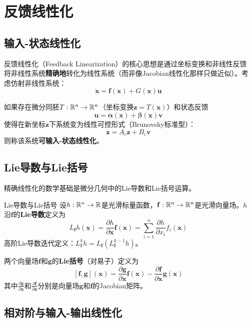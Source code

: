 \section{反馈线性化}

\subsection{输入-状态线性化}

反馈线性化（Feedback Linearization）的核心思想是通过坐标变换和非线性反馈将非线性系统\textbf{精确地}转化为线性系统（而非像Jacobian线性化那样只做近似）。考虑仿射非线性系统：
\[
\dot{\mathbf{x}} = \mathbf{f}(\mathbf{x}) + G(\mathbf{x})\mathbf{u}
\]

如果存在微分同胚$T: \mathbb{R}^n \to \mathbb{R}^n$（坐标变换$\mathbf{z} = T(\mathbf{x})$）和状态反馈
\[
\mathbf{u} = \boldsymbol{\alpha}(\mathbf{x}) + \boldsymbol{\beta}(\mathbf{x})\mathbf{v}
\]
使得在新坐标$\mathbf{z}$下系统变为线性可控形式（Brunovsky标准型）：
\[
\dot{\mathbf{z}} = A_c\mathbf{z} + B_c\mathbf{v}
\]
则称该系统\textbf{可输入-状态线性化}。

\subsection{Lie导数与Lie括号}

精确线性化的数学基础是微分几何中的Lie导数和Lie括号运算。

\begin{mydefinition}{Lie导数与Lie括号}
设$h: \mathbb{R}^n \to \mathbb{R}$是光滑标量函数，$\mathbf{f}: \mathbb{R}^n \to \mathbb{R}^n$是光滑向量场。$h$沿$\mathbf{f}$的\textbf{Lie导数}定义为
\[
L_{\mathbf{f}}h(\mathbf{x}) = \frac{\partial h}{\partial \mathbf{x}}\mathbf{f}(\mathbf{x}) = \sum_{i=1}^{n}\frac{\partial h}{\partial x_i}f_i(\mathbf{x})
\]
高阶Lie导数迭代定义：$L_{\mathbf{f}}^k h = L_{\mathbf{f}}(L_{\mathbf{f}}^{k-1}h)$。

两个向量场$\mathbf{f}$和$\mathbf{g}$的\textbf{Lie括号}（对易子）定义为
\[
[\mathbf{f}, \mathbf{g}](\mathbf{x}) = \frac{\partial \mathbf{g}}{\partial \mathbf{x}}\mathbf{f}(\mathbf{x}) - \frac{\partial \mathbf{f}}{\partial \mathbf{x}}\mathbf{g}(\mathbf{x})
\]
其中$\frac{\partial \mathbf{g}}{\partial \mathbf{x}}$和$\frac{\partial \mathbf{f}}{\partial \mathbf{x}}$分别是向量场$\mathbf{g}$和$\mathbf{f}$的Jacobian矩阵。
\end{mydefinition}

\subsection{相对阶与输入-输出线性化}

